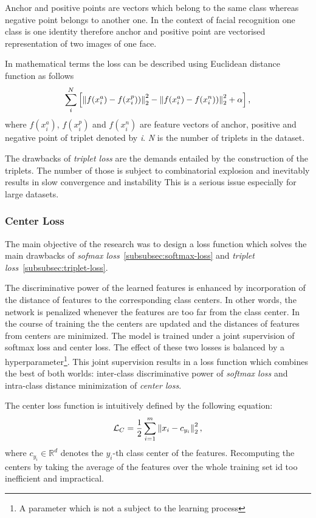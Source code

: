 Anchor and positive points are vectors which belong to the same class whereas negative point belongs to another one.
In the context of facial recognition one class is one identity therefore anchor and positive point are vectorised
representation of two images of one face.

In mathematical terms the loss can be described using Euclidean distance function as follows
\begin{equation}
    \sum_{i}^{N} \left[ \left\lVert f(x_{i}^{a}) - f(x_{i}^{p}))\right\rVert^2_2
    - \left\lVert f(x_{i}^{a}) - f(x_{i}^{n}))\right\rVert^2_2 + \alpha \right],
\end{equation}
where $f(x_{i}^{a})$, $f(x_{i}^{p})$ and $f(x_{i}^{n})$ are feature vectors of anchor, positive and
negative point of triplet denoted by \textit{i}.
\textit{N} is the number of triplets in the dataset.

The drawbacks of \textit{triplet loss} are the demands entailed by the construction of the triplets.
The number of those is subject to combinatorial explosion and inevitably results in slow convergence and instability
This is a serious issue especially for large datasets.

\subsubsection{Center Loss}
The main objective of the research was to design a loss function which solves the main drawbacks of
\textit{sofmax loss}~\ref{subsubsec:softmax-loss} and \textit{triplet loss}~\ref{subsubsec:triplet-loss}.

The discriminative power of the learned features is enhanced by incorporation of the distance of features to the
corresponding class centers.
In other words, the network is penalized whenever the features are too far from the class center.
In the course of training the the centers are updated and the distances of features from centers are minimized.
The model is trained under a joint supervision of softmax loss and center loss.
The effect of these two losses is balanced by a hyperparameter\footnote{A parameter which is not a subject to the
learning process}.
This joint supervision results in a loss function which combines the best of both worlds:
inter-class discriminative power of \textit{softmax loss} and intra-class distance minimization of \textit{center loss}.

The center loss function is intuitively defined by the following equation:
\begin{equation}
    \label{eq:center}
    \mathcal{L}_C = \frac{1}{2} \sum_{i=1}^{m} \left\lVert x_i - c_{y_i}\right\rVert_2^2,
\end{equation}
where $c_{y_i} \in \mathbb{R}^{d}$ denotes the $y_i$-th class center of the features.
Recomputing the centers by taking the average of the features over the whole training set id too inefficient and
impractical.

